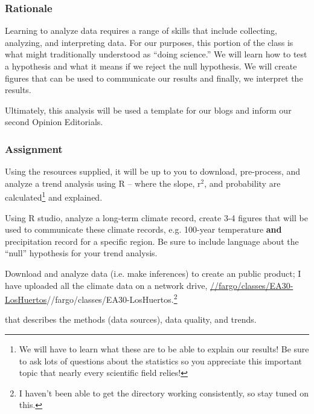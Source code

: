 
\subsubsection{Rationale}

Learning to analyze data requires a range of skills that include collecting, analyzing, and interpreting data. For our purposes, this portion of the class is what might traditionally understood as ``doing science.'' We will learn how to test a hypothesis and what it means if we reject the null hypothesis. We will create figures that can be used to communicate our results and finally, we interpret the results. 

Ultimately, this analysis will be used a template for our blogs and inform our second Opinion Editorials. 

\subsubsection{Assignment}

Using the resources supplied, it will be up to you to download, pre-process, and analyze a trend analysis using R -- where the slope, r$^2$, and probability are calculated\footnote{We will have to learn what these are to be able to explain our results! Be sure to ask lots of questions about the statistics so you appreciate this important topic that nearly every scientific field relies!} and explained. 

Using R studio, analyze a long-term climate record, create 3-4 figures that will be used to communicate these climate records, e.g. 100-year temperature \textbf{and} precipitation record for a specific region. Be sure to include language about the ``null'' hypothesis for your trend analysis.

\begin{enumerate*}
  \item Download and analyze data (i.e. make inferences) to create an public product; I have uploaded all the climate data on a network drive, \url{//fargo/classes/EA30-LosHuertos}{//fargo/classes/EA30-LosHuertos}.\footnote{I haven't been able to get the directory working consistently, so stay tuned on this.}
  
\end{enumerate*}
 that describes the methods (data sources), data quality, and trends. 


